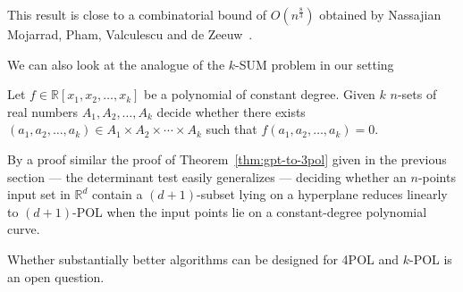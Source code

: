 This result is close to a combinatorial bound of $O(n^{\frac 83})$ obtained by
Nassajian Mojarrad, Pham, Valculescu and de Zeeuw~\cite{MPVd16}.

We can also look at the analogue of the $k$-SUM problem in our setting
\begin{problem}[$k$-POL]
Let $f \in \mathbb{R}[x_1,x_2,\ldots,x_k]$ be a polynomial of constant degree.
Given $k$ $n$-sets of real numbers $A_1, A_2, \ldots, A_k$ decide whether there
exists $(a_1,a_2,\ldots,a_k) \in A_1 \times A_2 \times \cdots \times A_k$ such
that $f(a_1,a_2,\ldots,a_k)=0$.
\end{problem}


By a proof similar the proof of Theorem~\ref{thm:gpt-to-3pol} given in the
previous section --- the determinant test easily generalizes --- deciding
whether an $n$-points input set in $\mathbb{R}^d$ contain a $(d+1)$-subset
lying on a hyperplane reduces linearly to $(d+1)$-POL when the input points lie
on a constant-degree polynomial curve.

Whether substantially better algorithms can be designed for 4POL and $k$-POL is
an open question.
